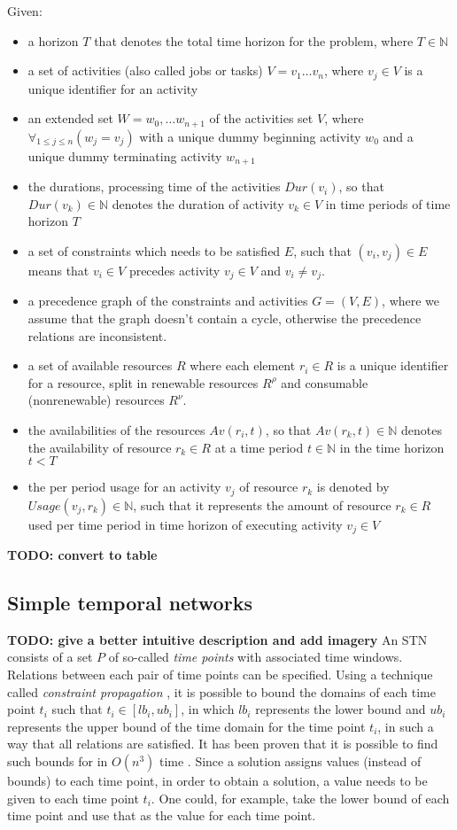 \documentclass{article}
\newcommand{\TODO}[1]{{\color{red}\textbf{TODO: #1}}}
\newcommand{\renres}[0]{R^\rho} %
\newcommand{\conres}[0]{R^\nu} %
\newcommand{\av}[1]{\textit{Av}(#1)} %
\newcommand{\dur}[1]{\textit{Dur}(#1)} %
\newcommand{\usage}[1]{\textit{Usage}(#1)} %
\begin{document}
Given:
\begin{itemize}
\item a horizon $T$ that denotes the total time horizon for the problem, where $T \in \mathbb{N}$
\item a set of activities (also called jobs or tasks) $V = v_1 \ldots v_n$, where $v_j \in V$ is a unique identifier for an activity
\item an extended set $W = w_0, \ldots w_{n+1}$ of the activities set $V$, where $\forall_{1 \leq j \leq n} (w_j = v_j)$ with a unique dummy beginning activity $w_0$ and a unique dummy terminating activity $w_{n+1}$
\item the durations, processing time of the activities $\dur{v_i}$, so that $\dur{v_k} \in \mathbb{N}$ denotes the duration of activity $v_k \in V$ in time periods of time horizon $T$
\item a set of constraints which needs to be satisfied $E$, such that $(v_i,v_j) \in E$ means that $v_i \in V$ precedes activity $v_j \in V$ and $v_i \neq v_j$.
\item a precedence graph of the constraints and activities $G = (V, E)$, where we assume that the graph doesn't contain a cycle, otherwise the precedence relations are inconsistent.
\item a set of available resources $R$ where each element $r_i \in R$ is a unique identifier for a resource, split in renewable resources $\renres$ and  consumable (nonrenewable) resources $\conres$.
\item the availabilities of the resources $\av{r_i, t}$, so that $\av{r_k, t} \in \mathbb{N}$ denotes the availability of resource $r_k \in R$ at a time period $t \in \mathbb{N}$ in the time horizon $t < T$
\item the per period usage for an activity $v_j$ of resource $r_k$ is denoted by $\usage{v_j, r_k} \in \mathbb{N}$, such that it represents the amount of resource $r_k \in R$ used per time period in time horizon of executing activity $v_j \in V$
\end{itemize}
\TODO{convert to table}

\subsection{Simple temporal networks}
\label{text:STN}
\TODO{give a better intuitive description and add imagery}
An STN consists of a set $P$ of so-called \emph{time points} with associated time windows.
Relations between each pair of time points can be specified.
Using a technique called \emph{constraint propagation} \cite{policella07}, it is possible to bound the domains of each time point $t_i$ such that $t_i \in [lb_i, ub_i]$, in which $lb_i$ represents the lower bound and $ub_i$ represents the upper bound of the time domain for the time point $t_i$, in such a way that all relations are satisfied.
It has been proven that it is possible to find such bounds for in $O(n^3)$ time \cite{policella07}.
Since a solution assigns values (instead of bounds) to each time point, in order to obtain a solution, a value needs to be given to each time point $t_i$.
One could, for example, take the lower bound of each time point and use that as the value for each time point.
\end{document}

